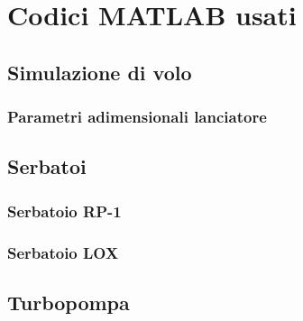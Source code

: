 \section{Codici MATLAB usati}
\label{appendix:codici}

\subsection{Simulazione di volo}



\subsubsection{Parametri adimensionali lanciatore}



\subsection{Serbatoi}

\subsubsection{Serbatoio RP-1}


\subsubsection{Serbatoio LOX}


\subsection{Turbopompa}





